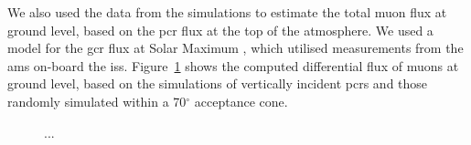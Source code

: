 We also used the data from the simulations to estimate the total muon flux at ground level, based on the \gls{pcr} flux at the top of the atmosphere. We used a model for the \gls{gcr} flux at Solar Maximum \citep{corti_numerical_2019}, which utilised measurements from the \gls{ams} on-board the \gls{iss}. Figure~\ref{fig:CORSIKA_muon_spectra} shows the computed differential flux of muons at ground level, based on the simulations of vertically incident \glspl{pcr} and those randomly simulated within a 70$^\circ$ acceptance cone.


\begin{figure}[ht!]
	\centering
	\qquad
	\caption{...}
	\label{fig:CORSIKA_muon_spectra}
\end{figure}


